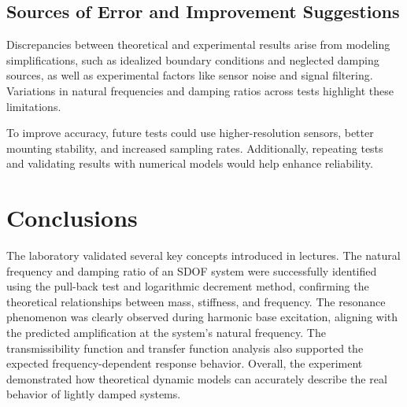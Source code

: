 \documentclass{article}  %
\begin{document}
\subsection{Sources of Error and Improvement Suggestions}

Discrepancies between theoretical and experimental results arise from modeling simplifications, such as idealized boundary conditions and neglected damping sources, as well as experimental factors like sensor noise and signal filtering. Variations in natural frequencies and damping ratios across tests highlight these limitations.

To improve accuracy, future tests could use higher-resolution sensors, better mounting stability, and increased sampling rates. Additionally, repeating tests and validating results with numerical models would help enhance reliability.

\newpage

\section{Conclusions}

The laboratory validated several key concepts introduced in lectures. The natural frequency and damping ratio of an SDOF system were successfully identified using the pull-back test and logarithmic decrement method, confirming the theoretical relationships between mass, stiffness, and frequency. The resonance phenomenon was clearly observed during harmonic base excitation, aligning with the predicted amplification at the system’s natural frequency. The transmissibility function and transfer function analysis also supported the expected frequency-dependent response behavior. Overall, the experiment demonstrated how theoretical dynamic models can accurately describe the real behavior of lightly damped systems.

\newpage

\nocite{*}

\end{document}
